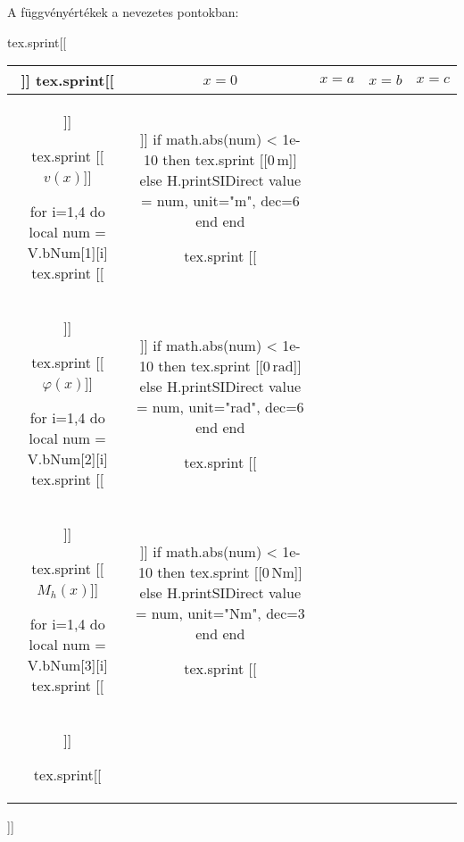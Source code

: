 A függvényértékek a nevezetes pontokban:
\begin{center}
\def\arraystretch{1.5}
\begin{luacode*}
  tex.sprint[[\begin{tabular}{c|cccc|}]]
  tex.sprint[[& $x = 0$ & $x = a$ & $x = b$ & $x = c$ \\\hline]]

  tex.sprint [[$v(x)$]]

  for i=1,4 do
    local num = V.bNum[1][i]
    tex.sprint [[&]]
    if math.abs(num) < 1e-10 then
      tex.sprint [[$0\,\mathrm{m}$]]
    else
      H.printSIDirect { value = num, unit="m", dec=6 }
    end
  end

  tex.sprint [[\\]]

  tex.sprint [[$\varphi(x)$]]

  for i=1,4 do
    local num = V.bNum[2][i]
    tex.sprint [[&]]
    if math.abs(num) < 1e-10 then
      tex.sprint [[$0\,\mathrm{rad}$]]
    else
      H.printSIDirect { value = num, unit="rad", dec=6 }
    end
  end

  tex.sprint [[\\]]

  tex.sprint [[$M_h(x)$]]

  for i=1,4 do
    local num = V.bNum[3][i]
    tex.sprint [[&]]
    if math.abs(num) < 1e-10 then
      tex.sprint [[$0\,\mathrm{Nm}$]]
    else
      H.printSIDirect { value = num, unit="Nm", dec=3 }
    end
  end

  tex.sprint [[\\\hline]]

  tex.sprint[[\end{tabular}]]
\end{luacode*}
\end{center}
